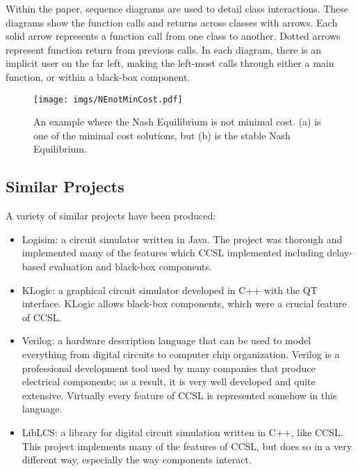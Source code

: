 \documentclass{article}
\begin{document}
Within the paper, sequence diagrams are used to detail class interactions. These diagrams show the function calls and returns across classes with arrows. Each solid arrow represents a function call from one class to another. Dotted arrows represent function return from previous calls. In each diagram, there is an implicit user on the far left, making the left-most calls through either a main function, or within a black-box component.

\begin{figure}
    \begin{center}
        \texttt{[image: imgs/NEnotMinCost.pdf]}
    \end{center}
    \caption{An example where the Nash Equilibrium is not minimal cost.
        (a) is one of the minimal cost solutions, but (b) is the stable Nash
        Equilibrium.}
\end{figure}

\subsection{Similar Projects}

A variety of similar projects have been produced:

\begin{itemize}

\item Logisim: a circuit simulator written in Java. The project was thorough and implemented many of the features which CCSL implemented including delay-based evaluation and black-box components.

\item KLogic: a graphical circuit simulator developed in C++ with the QT interface. KLogic allows black-box components, which were a crucial feature of CCSL.

\item Verilog: a hardware description language that can be used to model everything from digital circuits to computer chip organization. Verilog is a professional development tool used by many companies that produce electrical components; as a result, it is very well developed and quite extensive. Virtually every feature of CCSL is represented somehow in this language.

\item LibLCS: a library for digital circuit simulation written in C++, like CCSL. This project implements many of the features of CCSL, but does so in a very different way, especially the way components interact.

\end{itemize}
\end{document}
